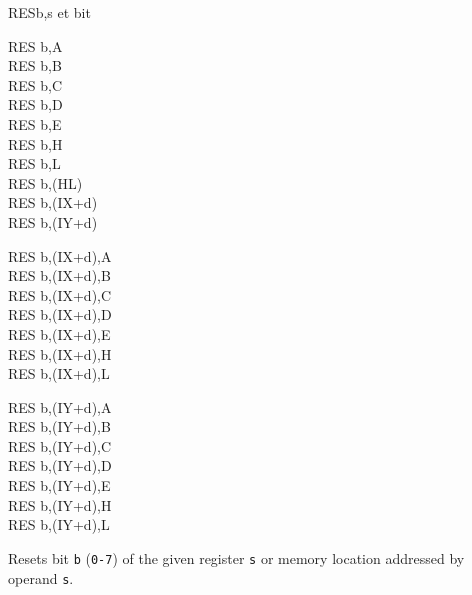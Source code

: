 \begin{basedescript}{
	\desclabelstyle{\multilinelabel}
	\desclabelwidth{3cm}}
	\begin{DetailItem}{RES}{b,s}
		{et bit}
		{}

		\begin{DetailVariants}
			RES b,A\\
			RES b,B\\
			RES b,C\\
			RES b,D\\
			RES b,E\\
			RES b,H\\
			RES b,L\\
			RES b,(HL)\\
			RES b,(IX+d)\\
			RES b,(IY+d)

			\columnbreak
			RES b,(IX+d),A\UNDOC\\
			RES b,(IX+d),B\UNDOC\\
			RES b,(IX+d),C\UNDOC\\
			RES b,(IX+d),D\UNDOC\\
			RES b,(IX+d),E\UNDOC\\
			RES b,(IX+d),H\UNDOC\\
			RES b,(IX+d),L\UNDOC

			\columnbreak
			RES b,(IY+d),A\UNDOC\\
			RES b,(IY+d),B\UNDOC\\
			RES b,(IY+d),C\UNDOC\\
			RES b,(IY+d),D\UNDOC\\
			RES b,(IY+d),E\UNDOC\\
			RES b,(IY+d),H\UNDOC\\
			RES b,(IY+d),L\UNDOC
		\end{DetailVariants}

		Resets bit {\tt b} ({\tt 0-7}) of the given register {\tt s} or memory location addressed by operand {\tt s}.

		\begin{DetailEffects}
			\FlagsRESr
		\end{DetailEffects}
						
		\begin{DetailTiming}
		\end{DetailTiming}

	\end{DetailItem}


\end{basedescript}

